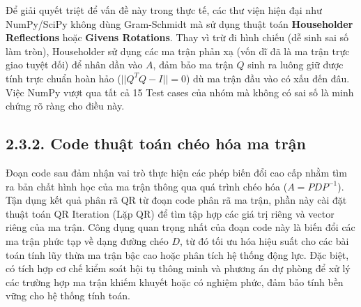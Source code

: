 Để giải quyết triệt để vấn đề này trong thực tế, các thư viện hiện đại như NumPy/SciPy không dùng Gram-Schmidt mà sử dụng thuật toán \textbf{Householder Reflections} hoặc \textbf{Givens Rotations}. Thay vì trừ đi hình chiếu (dễ sinh sai số làm tròn), Householder sử dụng các ma trận phản xạ (vốn dĩ đã là ma trận trực giao tuyệt đối) để nhân dần vào $A$, đảm bảo ma trận $Q$ sinh ra luông giữ được tính trực chuẩn hoàn hảo ($||Q^TQ - I|| = 0$) dù ma trận đầu vào có xấu đến đâu. Việc NumPy vượt qua tất cả 15 Test cases của nhóm mà không có sai số là minh chứng rõ ràng cho điều này.



\subsection*{2.3.2. Code thuật toán chéo hóa ma trận}
{}
Đoạn code sau đảm nhận vai trò thực hiện các phép biến đổi cao cấp nhằm tìm ra bản chất hình học của ma trận thông qua quá trình chéo hóa ($A = PDP^{-1}$). Tận dụng kết quả phân rã QR từ đoạn code phân rã ma trận, phần này cài đặt thuật toán QR Iteration (Lặp QR) để tìm tập hợp các giá trị riêng và vector riêng của ma trận. Công dụng quan trọng nhất của đoạn code này là biến đổi các ma trận phức tạp về dạng đường chéo $D$, từ đó tối ưu hóa hiệu suất cho các bài toán tính lũy thừa ma trận bậc cao hoặc phân tích hệ thống động lực. Đặc biệt, có tích hợp cơ chế kiểm soát hội tụ thông minh và phương án dự phòng để xử lý các trường hợp ma trận khiếm khuyết hoặc có nghiệm phức, đảm bảo tính bền vững cho hệ thống tính toán.


    
    
    
